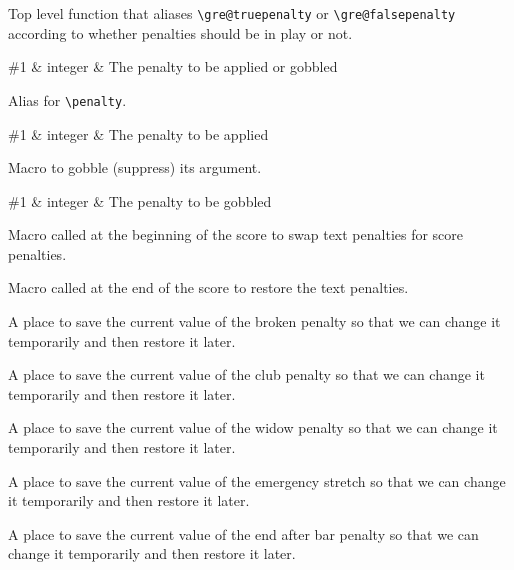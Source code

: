 Top level function that aliases \verb=\gre@truepenalty= or \verb=\gre@falsepenalty= according to whether penalties should be in play or not.

\begin{argtable}
  \#1 & integer & The penalty to be applied or gobbled\\
\end{argtable}

Alias for \verb=\penalty=.

\begin{argtable}
  \#1 & integer & The penalty to be applied\\
\end{argtable}

Macro to gobble (suppress) its argument.

\begin{argtable}
  \#1 & integer & The penalty to be gobbled\\
\end{argtable}

Macro called at the beginning of the score to swap text penalties for score penalties.

Macro called at the end of the score to restore the text penalties.

A place to save the current value of the broken penalty so that we can change it temporarily and then restore it later.

A place to save the current value of the club penalty so that we can change it temporarily and then restore it later.

A place to save the current value of the widow penalty so that we can change it temporarily and then restore it later.

A place to save the current value of the emergency stretch so that we can change it temporarily and then restore it later.

A place to save the current value of the end after bar penalty so that we can change it temporarily and then restore it later.

